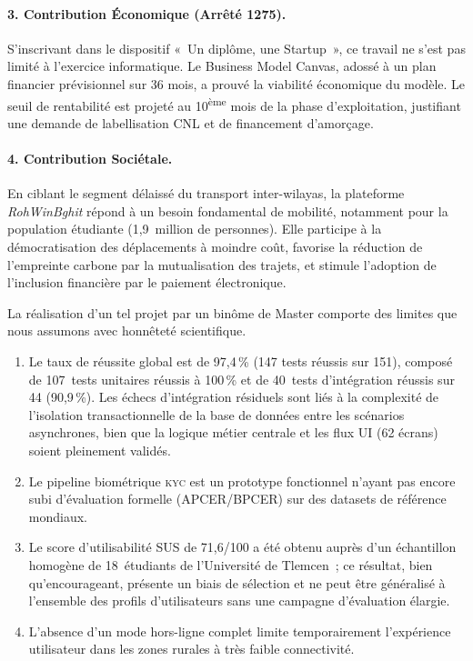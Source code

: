 \paragraph{3. Contribution Économique (Arrêté 1275).} 
S'inscrivant dans le dispositif «~Un diplôme, une Startup~», ce travail ne s'est pas limité à l'exercice informatique. Le Business Model Canvas, adossé à un plan financier prévisionnel sur 36 mois, a prouvé la viabilité économique du modèle. Le seuil de rentabilité est projeté au 10\textsuperscript{ème} mois de la phase d'exploitation, justifiant une demande de labellisation CNL et de financement d'amorçage.

\paragraph{4. Contribution Sociétale.} 
En ciblant le segment délaissé du transport inter-wilayas, la plateforme \textit{RohWinBghit} répond à un besoin fondamental de mobilité, notamment pour la population étudiante (1,9~million de personnes). Elle participe à la démocratisation des déplacements à moindre coût, favorise la réduction de l'empreinte carbone par la mutualisation des trajets, et stimule l'adoption de l'inclusion financière par le paiement électronique.

La réalisation d'un tel projet par un binôme de Master comporte des limites que nous assumons avec honnêteté scientifique.
\begin{enumerate}
  \item Le taux de réussite global est de 97,4\,\% (147 tests réussis sur 151), composé de 107~tests unitaires réussis à 100\,\% et de 40~tests d'intégration réussis sur 44 (90,9\,\%). Les échecs d'intégration résiduels sont liés à la complexité de l'isolation transactionnelle de la base de données entre les scénarios asynchrones, bien que la logique métier centrale et les flux UI (62 écrans) soient pleinement validés.
  \item Le pipeline biométrique \textsc{kyc} est un prototype fonctionnel n'ayant pas encore subi d'évaluation formelle (APCER/BPCER) sur des datasets de référence mondiaux.
  \item Le score d'utilisabilité SUS de 71,6/100 a été obtenu auprès d'un échantillon homogène de 18~étudiants de l'Université de Tlemcen~; ce résultat, bien qu'encourageant, présente un biais de sélection et ne peut être généralisé à l'ensemble des profils d'utilisateurs sans une campagne d'évaluation élargie.
  \item L'absence d'un mode hors-ligne complet limite temporairement l'expérience utilisateur dans les zones rurales à très faible connectivité.
\end{enumerate}

